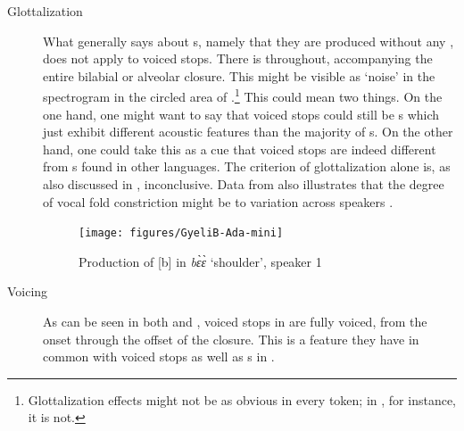 \documentclass[output=paper]{LSP/langsci}
\begin{document}
\begin{description}
 \item [Glottalization}]


 What \citet[28]{Maddieson2003} generally says about  s, namely that they are produced without any , does not apply to  voiced stops. There is  throughout, accompanying the entire bilabial or alveolar closure. This might be visible as `noise' in the spectrogram in the circled area of .\footnote{Glottalization effects might not be as obvious in every token; in , for instance, it is not.} This could mean two things. On the one hand, one might want to say that  voiced stops could still be s which just exhibit different acoustic features than the majority of  s. On the other hand, one could take this as a cue that  voiced stops are indeed different from s found in other  languages. The criterion of glottalization alone is, as also discussed in , inconclusive. Data from  also illustrates that the degree of vocal fold constriction might be  to variation across speakers \citep[75]{Nagano2012}. 

\begin{figure}
\caption{Production of [b] in {\it bɛ̀ɛ̀} `shoulder', speaker 1}
\label{fig:grimm:2}
\texttt{[image: figures/GyeliB-Ada-mini]}
\end{figure}

\item[Voicing] As can be seen in both  and , voiced stops in  are fully voiced, from the onset through the offset of the closure. This is a feature they have in common with voiced stops as well as s in  \citep[74]{Nagano2012}.



\end{description}
\end{document}
